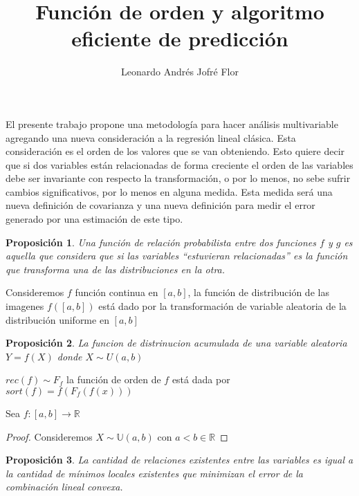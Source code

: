 \documentclass{article}
\title{Función de orden y algoritmo eficiente de predicción}
\author{Leonardo Andrés Jofré Flor}
\newtheorem{prop}{Proposición}
\begin{document}
\maketitle

\begin{summary}
El presente trabajo propone una metodología para hacer análisis multivariable
agregando una nueva consideración a la regresión lineal clásica. Esta
consideración es el orden de los valores que se van obteniendo. Esto quiere
decir que si dos variables están relacionadas de forma creciente el orden de las
variables debe ser invariante con respecto la transformación, o por lo menos, no
sebe sufrir cambios significativos, por lo menos en alguna medida. Esta medida
será una nueva definición de covarianza y una nueva definición para medir el
error generado por una estimación de este tipo.
\end{summary}

\begin{prop}
Una función de relación probabilista entre dos funciones $f$ y $g$ es aquella
que considera que si las variables ``estuvieran relacionadas'' es la función que
transforma una de las distribuciones en la otra.
\end{prop}

 Consideremos $f$ función continua en $\left[a,b\right]$, la
función de distribución de las imagenes $f\left(\left[a,b\right]\right)$
está dado por la transformación de variable aleatoria de la
distribución uniforme en $[a,b]$

\begin{prop} La funcion de distrinucion acumulada de una variable
  aleatoria $Y=f\left(X\right)$ donde $X\sim U\left(a,b\right)$  
\end{prop}

$rec(f)\sim F_f$ la función de orden de $f$ está dada por $sort(f) =
f(F_f(f(x)))$

Sea $f:\left[a,b\right]\to\mathbb{R}$

\begin{proof}
	Consideremos $X\sim \mathbb{U}\left(a,b\right)$ con $a<b \in \mathbb{R}$
\end{proof}

\begin{prop}
 La cantidad de relaciones existentes entre las variables es igual a la cantidad
 de mínimos locales existentes que minimizan el error de la combinación lineal
 convexa.
\end{prop}
\end{document}
